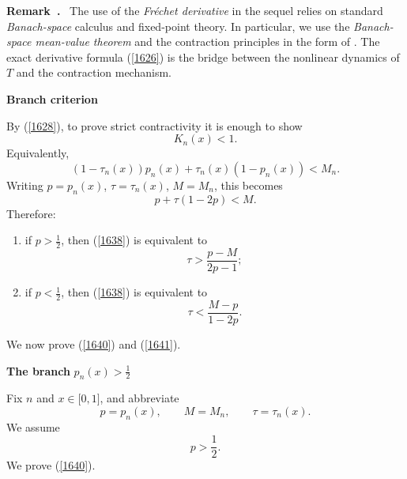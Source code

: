\documentclass[onecolumn]{article}
\newenvironment{remark}{  \refstepcounter{theorem}  \par\medskip\noindent\textbf{Remark~\thetheorem.}\rmfamily\ }{\par\medskip}
\begin{document}
\begin{remark}
\label{functional-analytic-input} The use of the \textit{Fr\'{e}chet
derivative} in the sequel relies on standard \textit{Banach-space} calculus
and fixed-point theory. In particular, we use the \textit{Banach-space
mean-value theorem} and the contraction principles in the form of \cite[%
Theorem~9.9 (mean value theorem), Theorem~9.27 (contraction principle),
Theorem~9.29 (uniform contraction principle)]{[64]}. The exact derivative
formula (\ref{1626}) is the bridge between the nonlinear dynamics of $T$ and
the contraction mechanism.
\end{remark}

\begin{flushleft}
\textbf{Branch criterion}
\end{flushleft}

By (\ref{1628}), to prove strict contractivity it is enough to show 
\begin{equation}
K_{n}(x)<1.  \label{1637}
\end{equation}%
Equivalently, 
\begin{equation}
(1-\tau _{n}(x))p_{n}(x)+\tau _{n}(x)(1-p_{n}(x))<M_{n}.  \label{1638}
\end{equation}%
Writing $p=p_{n}(x)$, $\tau =\tau _{n}(x)$, $M=M_{n}$, this becomes 
\begin{equation}
p+\tau (1-2p)<M.  \label{1639}
\end{equation}%
Therefore:

\begin{enumerate}
\item if $p>\frac{1}{2}$, then (\ref{1638}) is equivalent to 
\begin{equation}
\tau >\frac{p-M}{2p-1};  \label{1640}
\end{equation}

\item if $p<\frac{1}{2}$, then (\ref{1638}) is equivalent to 
\begin{equation}
\tau <\frac{M-p}{1-2p}.  \label{1641}
\end{equation}
\end{enumerate}

We now prove (\ref{1640}) and (\ref{1641}).

\begin{flushleft}
\textbf{The branch }$p_{n}(x)>\frac{1}{2}$
\end{flushleft}

Fix $n$ and $x\in \lbrack 0,1]$, and abbreviate 
\begin{equation}
p=p_{n}(x),\qquad M=M_{n},\qquad \tau =\tau _{n}(x).  \label{1642}
\end{equation}%
We assume 
\begin{equation}
p>\frac{1}{2}.  \label{1643}
\end{equation}%
We prove (\ref{1640}).
\end{document}
